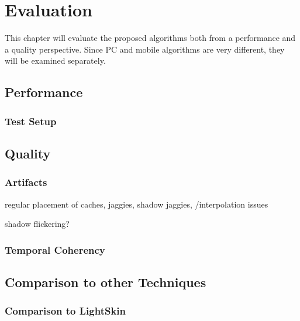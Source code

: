 \documentclass[thesis.tex]{subfiles}
\begin{document}
\chapter{Evaluation}
This chapter will evaluate the proposed algorithms both from a performance and a quality perspective. Since PC and mobile algorithms are very different, they will be examined separately.

\section{Performance}

\subsection{Test Setup}

\newpage

\section{Quality}

\subsection{Artifacts}

regular placement of caches, jaggies,
shadow jaggies,
/interpolation issues

shadow flickering?


\subsection{Temporal Coherency}


\section{Comparison to other Techniques}

\subsection{Comparison to LightSkin}

\subfilebib %
\end{document}
